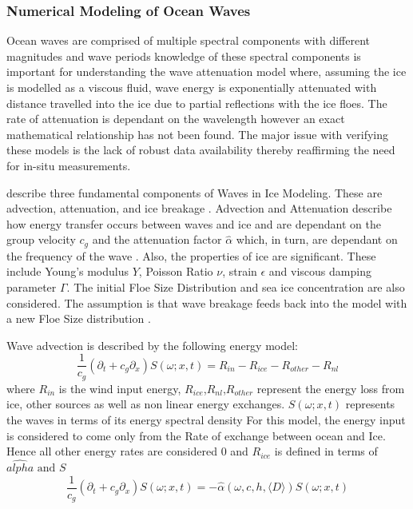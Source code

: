 \subsubsection{Numerical Modeling of Ocean Waves}
Ocean waves are comprised of multiple spectral components with different magnitudes and wave periods knowledge of these spectral components is important for understanding the wave attenuation model \cite{williams2013wave} where, assuming the ice is modelled as a viscous fluid, wave energy is exponentially attenuated \cite{meylan2014situ}\cite{williams2013wave} with distance travelled into the ice due to partial reflections with the ice floes. The rate of attenuation is dependant on the wavelength however an exact mathematical relationship has not been found. The major issue with verifying these models is the lack of robust data availability \cite{meylan2014situ} thereby reaffirming the need for in-situ measurements.\par 
\textcite{williams2013wave} describe three fundamental components of Waves in Ice Modeling. These are advection, attenuation, and ice breakage \cite{williams2013wave}. Advection and Attenuation describe how energy transfer occurs between waves and ice and are dependant on the group velocity $c_g$ and the attenuation factor $\hat{\alpha}$ which, in turn, are dependant on the frequency of the wave \cite{williams2013wave}. Also, the properties of ice are significant. These include Young's modulus $Y$, Poisson Ratio $\nu$, strain $\epsilon$ and viscous damping parameter $\Gamma$. The initial Floe Size Distribution and sea ice concentration are also considered. The assumption is that wave breakage feeds back into the model with a new Floe Size distribution \cite{williams2013wave}. \par

Wave advection is described by the following energy model:
\begin{equation}
	\frac{1}{c_g}(\partial_t +c_g\partial_x)S(\omega;x,t) = R_{in}- R_{ice} - R_{other}- R_{nl}
\end{equation}
where $R_{in}$ is the wind input energy, $R_{ice}$,$R_{nl}$,$R_{other}$ represent the energy loss from ice, other sources as well as non linear energy exchanges. $S(\omega;x,t)$ represents the waves in terms of its energy spectral density \cite{williams2013wave} For this model, the energy input is considered to come only from the Rate of exchange between ocean and Ice. Hence all other energy rates are considered 0 and $R_{ice}$ is defined in terms of $\hat{alpha} \text{ and } S$
\begin{equation}
	\frac{1}{c_g}(\partial_t +c_g\partial_x)S(\omega;x,t)  = -\hat{\alpha}(\omega,c,h,\langle D \rangle)S(\omega;x,t)
\end{equation}

